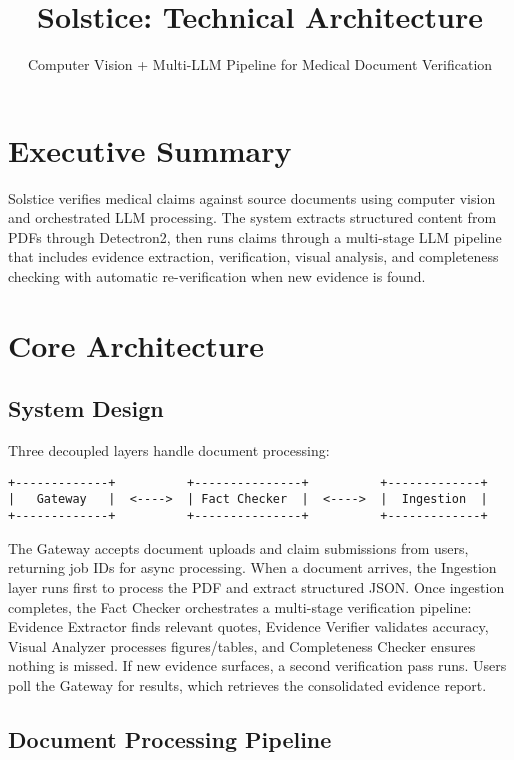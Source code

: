 \documentclass[11pt]{article}
\title{\textbf{Solstice: Technical Architecture}}
\author{Computer Vision + Multi-LLM Pipeline for Medical Document Verification}
\date{}
\begin{document}
\maketitle

\section{Executive Summary}

Solstice verifies medical claims against source documents using computer vision and orchestrated LLM processing. The system extracts structured content from PDFs through Detectron2, then runs claims through a multi-stage LLM pipeline that includes evidence extraction, verification, visual analysis, and completeness checking with automatic re-verification when new evidence is found.

\section{Core Architecture}

\subsection{System Design}

Three decoupled layers handle document processing:

\begin{verbatim}
+-------------+          +---------------+          +-------------+
|   Gateway   |  <---->  | Fact Checker  |  <---->  |  Ingestion  |
+-------------+          +---------------+          +-------------+
\end{verbatim}

The Gateway accepts document uploads and claim submissions from users, returning job IDs for async processing. When a document arrives, the Ingestion layer runs first to process the PDF and extract structured JSON. Once ingestion completes, the Fact Checker orchestrates a multi-stage verification pipeline: Evidence Extractor finds relevant quotes, Evidence Verifier validates accuracy, Visual Analyzer processes figures/tables, and Completeness Checker ensures nothing is missed. If new evidence surfaces, a second verification pass runs. Users poll the Gateway for results, which retrieves the consolidated evidence report.

\subsection{Document Processing Pipeline}
\end{document}

